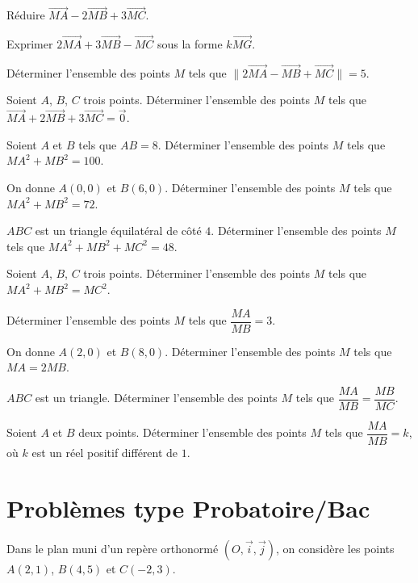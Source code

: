 
\exo{}
Réduire $\overrightarrow{MA} - 2\overrightarrow{MB} + 3\overrightarrow{MC}$.

\exo{}
Exprimer $2\overrightarrow{MA} + 3\overrightarrow{MB} - \overrightarrow{MC}$ sous la forme $k\overrightarrow{MG}$.

\exo{}
Déterminer l'ensemble des points $M$ tels que $\|2\overrightarrow{MA} - \overrightarrow{MB} + \overrightarrow{MC}\| = 5$.

\exo{}
Soient $A$, $B$, $C$ trois points. Déterminer l'ensemble des points $M$ tels que $\overrightarrow{MA} + 2\overrightarrow{MB} + 3\overrightarrow{MC} = \vec{0}$.


\exo{}
Soient $A$ et $B$ tels que $AB = 8$. Déterminer l'ensemble des points $M$ tels que $MA^2 + MB^2 = 100$.

\exo{}
On donne $A(0,0)$ et $B(6,0)$. Déterminer l'ensemble des points $M$ tels que $MA^2 + MB^2 = 72$.

\exo{}
$ABC$ est un triangle équilatéral de côté $4$. Déterminer l'ensemble des points $M$ tels que $MA^2 + MB^2 + MC^2 = 48$.

\exo{}
Soient $A$, $B$, $C$ trois points. Déterminer l'ensemble des points $M$ tels que $MA^2 + MB^2 = MC^2$.


\exo{}
Déterminer l'ensemble des points $M$ tels que $\dfrac{MA}{MB} = 3$.

\exo{}
On donne $A(2,0)$ et $B(8,0)$. Déterminer l'ensemble des points $M$ tels que $MA = 2MB$.

\exo{}
$ABC$ est un triangle. Déterminer l'ensemble des points $M$ tels que $\dfrac{MA}{MB} = \dfrac{MB}{MC}$.

\exo{}
Soient $A$ et $B$ deux points. Déterminer l'ensemble des points $M$ tels que $\dfrac{MA}{MB} = k$, où $k$ est un réel positif différent de $1$.

\section{Problèmes type Probatoire/Bac}

\label{prob:1}
Dans le plan muni d'un repère orthonormé $(O,\vec{i},\vec{j})$, on considère les points $A(2,1)$, $B(4,5)$ et $C(-2,3)$.

